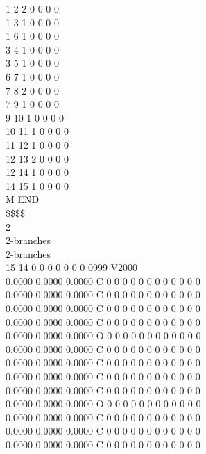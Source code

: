 \documentclass[11pt,titlepage,dvipdfmx,twoside]{jarticle}
\begin{document}
\begin{oframed}
{  1  2  2  0  0  0  0\\
  1  3  1  0  0  0  0\\
  1  6  1  0  0  0  0\\
  3  4  1  0  0  0  0\\
  3  5  1  0  0  0  0\\
  6  7  1  0  0  0  0\\
  7  8  2  0  0  0  0\\
  7  9  1  0  0  0  0\\
  9 10  1  0  0  0  0\\
 10 11  1  0  0  0  0\\
 11 12  1  0  0  0  0\\
 12 13  2  0  0  0  0\\
 12 14  1  0  0  0  0\\
 14 15  1  0  0  0  0\\
M  END\\
\$\$\$\$\\
2\\
2-branches\\
2-branches\\
 15 14  0  0  0  0  0  0  0  0999 V2000 \\
    0.0000    0.0000    0.0000  C  0  0  0  0  0  0  0  0  0  0  0  0\\
    0.0000    0.0000    0.0000  C  0  0  0  0  0  0  0  0  0  0  0  0\\
    0.0000    0.0000    0.0000  C  0  0  0  0  0  0  0  0  0  0  0  0\\
    0.0000    0.0000    0.0000  C  0  0  0  0  0  0  0  0  0  0  0  0\\
    0.0000    0.0000    0.0000  O  0  0  0  0  0  0  0  0  0  0  0  0\\
    0.0000    0.0000    0.0000  C  0  0  0  0  0  0  0  0  0  0  0  0\\
    0.0000    0.0000    0.0000  C  0  0  0  0  0  0  0  0  0  0  0  0\\
    0.0000    0.0000    0.0000  C  0  0  0  0  0  0  0  0  0  0  0  0\\
    0.0000    0.0000    0.0000  C  0  0  0  0  0  0  0  0  0  0  0  0\\
    0.0000    0.0000    0.0000  O  0  0  0  0  0  0  0  0  0  0  0  0\\
    0.0000    0.0000    0.0000  C  0  0  0  0  0  0  0  0  0  0  0  0\\
    0.0000    0.0000    0.0000  C  0  0  0  0  0  0  0  0  0  0  0  0\\
    0.0000    0.0000    0.0000  C  0  0  0  0  0  0  0  0  0  0  0  0\\
}
\end{oframed}
\end{document}
